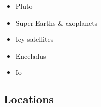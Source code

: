 \begin{itemize}
\begin{scriptsize}
\cite{reki07,king08,roba12} 
\end{scriptsize}

\item Pluto 

\begin{scriptsize}
\cite{mcnw16}
\end{scriptsize}

\item Super-Earths \& exoplanets 
{\scriptsize
\cite{stfl11}\cite{vata11}\cite{stlh13}\cite{welo15}\cite{miko15}\cite{kamo15}
}
\item Icy satellites  
{\scriptsize
\cite{kasc12b}
}
\item Enceladus  
{\scriptsize
\cite{roni08,betc10,hats12,robg14}
}
\item Io  
{\scriptsize
\cite{tasg01}
\cite{tack01}
}
\end{itemize}

\subsection{Locations}

